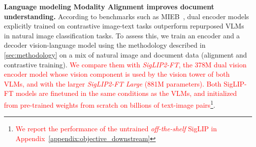 \noindent\textbf{Language modeling Modality Alignment improves document understanding.}
According to benchmarks such as MIEB~\citep{xiao2025miebmassiveimageembedding}, dual encoder models explicitly trained on contrastive image-text tasks outperform repurposed VLMs in natural image classification tasks. 
To assess this, we train an encoder and a decoder vision-language model using the methodology described in \autoref{sec:methodology} on a mix of natural image and document data (alignment and contrastive training). \textcolor{red}{We compare them with \textit{SigLIP2-FT}, the 378M dual vision encoder model whose vision component is used by the vision tower of both VLMs, and with the larger \textit{SigLIP2-FT Large} (881M parameters). Both SigLIP-FT models are finetuned in the same conditions as the VLMs, and initialized from pre-trained weights from scratch on billions of text-image pairs}\footnote{\textcolor{red}{We report the performance of the untrained \textit{off-the-shelf} SigLIP in Appendix~\ref{appendix:objective_downstream}}}.

